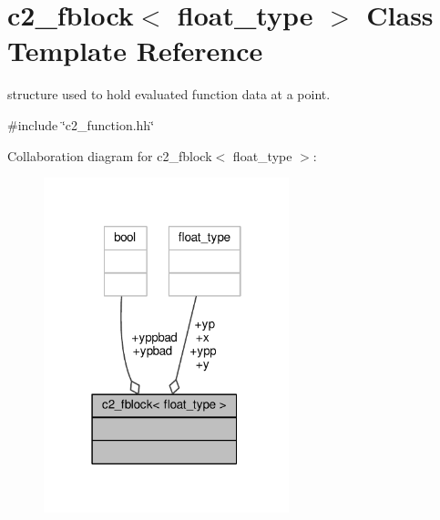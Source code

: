 \hypertarget{classc2__fblock}{}\section{c2\+\_\+fblock$<$ float\+\_\+type $>$ Class Template Reference}
\label{classc2__fblock}


structure used to hold evaluated function data at a point.  




{\ttfamily \#include \char`\"{}c2\+\_\+function.\+hh\char`\"{}}



Collaboration diagram for c2\+\_\+fblock$<$ float\+\_\+type $>$\+:
\nopagebreak
\begin{figure}[H]
\begin{center}
\leavevmode
\includegraphics[width=202pt]{classc2__fblock__coll__graph}
\end{center}
\end{figure}
